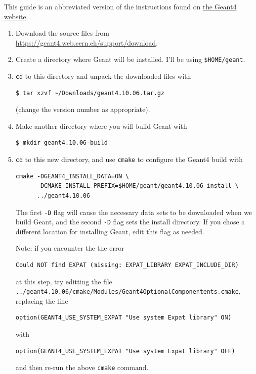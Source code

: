 \documentclass[12pt]{article}
\begin{document}
This guide is an abbreviated version of the instructions found on \href{http://geant4-userdoc.web.cern.ch/geant4-userdoc/UsersGuides/InstallationGuide/html/}{the Geant4 website}.
\begin{enumerate}
\item
Download the source files from \url{https://geant4.web.cern.ch/support/download}.

\item
Create a directory where Geant will be installed.  I'll be using \texttt{\$HOME/geant}.

\item
\texttt{cd} to this directory and unpack the downloaded files with
\begin{verbatim}
$ tar xzvf ~/Downloads/geant4.10.06.tar.gz
\end{verbatim}
(change the version number as appropriate).

\item
Make another directory where you will build Geant with
\begin{verbatim}
$ mkdir geant4.10.06-build
\end{verbatim}

\item
\texttt{cd} to this new directory, and use \texttt{cmake} to configure the Geant4 build with
\begin{verbatim}
cmake -DGEANT4_INSTALL_DATA=ON \
      -DCMAKE_INSTALL_PREFIX=$HOME/geant/geant4.10.06-install \
      ../geant4.10.06
\end{verbatim}
The first \texttt{-D} flag will cause the necessary data sets to be downloaded when we build Geant, and the second \texttt{-D} flag sets the install directory.
If you chose a different location for installing Geant, edit this flag as needed.

Note: if you encounter the the error
\begin{verbatim}
Could NOT find EXPAT (missing: EXPAT_LIBRARY EXPAT_INCLUDE_DIR)
\end{verbatim}
at this step, try editting the file \\
\texttt{../geant4.10.06/cmake/Modules/Geant4OptionalComponentents.cmake}, \\
replacing the line
\begin{verbatim}
option(GEANT4_USE_SYSTEM_EXPAT "Use system Expat library" ON)
\end{verbatim}
with
\begin{verbatim}
option(GEANT4_USE_SYSTEM_EXPAT "Use system Expat library" OFF)
\end{verbatim}
and then re-run the above \texttt{cmake} command.


\end{enumerate}
\end{document}
